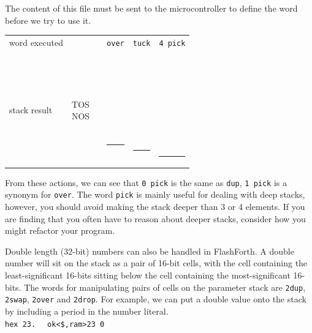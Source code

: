\documentclass[12pt,a4paper]{article}
\begin{document}
The content of this file must be sent to the microcontroller to define the word before we try to use it. 
\begin{center}
 \begin{tabular}{lc|cccc}
 word executed & & & \verb!over! & \verb!tuck! & \verb!4 pick! \\
 \\
 stack result  
 & \parbox[t]{35pt}{TOS \\ NOS} 
 & \parbox[t]{30pt}{ \\  \\  \\  \\ \rule{30pt}{2pt}} 
 & \parbox[t]{30pt}{ \\  \\  \\  \\  \\ \rule{30pt}{2pt}}
 & \parbox[t]{30pt}{ \\  \\  \\  \\  \\  \\ \rule{30pt}{2pt}}
 & \parbox[t]{30pt}{ \\  \\  \\  \\  \\  \\  \\ \rule{30pt}{2pt}}
 \end{tabular}
\end{center}
From these actions, we can see that \verb!0 pick! is the same as \verb!dup!,
\verb!1 pick! is a synonym for \verb!over!.
The word \verb!pick! is mainly useful for dealing with deep stacks, however,
you should avoid making the stack deeper than 3 or 4 elements.
If you are finding that you often have to reason about deeper stacks, 
consider how you might refactor your program.

\medskip
Double length (32-bit) numbers can also be handled in FlashForth.
A double number will sit on the stack as a pair of 16-bit cells, 
with the cell containing the least-significant 16-bits 
sitting below the cell containing the most-significant 16-bits. 
The words for manipulating pairs of cells on the parameter stack are
\verb!2dup!, \verb!2swap!, \verb!2over! and \verb!2drop!.
For example, we can put a double value onto the stack by including a period
in the number literal.\vspace{7pt} \\
\verb!hex 23. ! \fbox{$\hookleftarrow$} \verb! ok<$,ram>23 0! \vspace{7pt} \\
\end{document}
